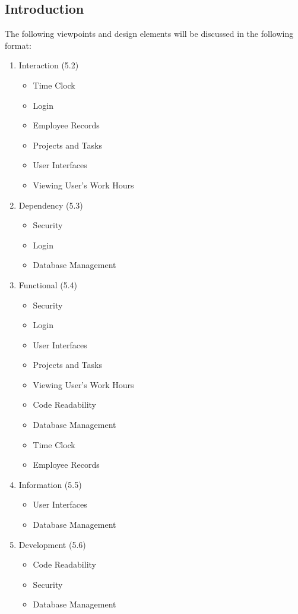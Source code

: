 \documentclass[letterpaper,10pt,titlepage,journal,compsoc,draftclsnofoot,onecolumn]{IEEEtran}
\begin{document}
\subsection{Introduction}

The following viewpoints and design elements will be discussed in the following format:

\begin{enumerate}
\item{Interaction (5.2)}
\begin{itemize}
\item{Time Clock}
\item{Login}
\item{Employee Records}
\item{Projects and Tasks}
\item{User Interfaces}
\item{Viewing User's Work Hours}
\end{itemize}
\item{Dependency (5.3)}
\begin{itemize}
\item{Security}
\item{Login}
\item{Database Management}
\end{itemize}
\item{Functional (5.4)}
\begin{itemize}
\item{Security}
\item{Login}
\item{User Interfaces}
\item{Projects and Tasks}
\item{Viewing User's Work Hours}
\item{Code Readability}
\item{Database Management}
\item{Time Clock}
\item{Employee Records}
\end{itemize}
\item{Information (5.5)}
\begin{itemize}
\item{User Interfaces}
\item{Database Management}
\end{itemize}
\item{Development (5.6)}
\begin{itemize}
\item{Code Readability}
\item{Security}
\item{Database Management}
\end{itemize}
\end{enumerate}
\end{document}

